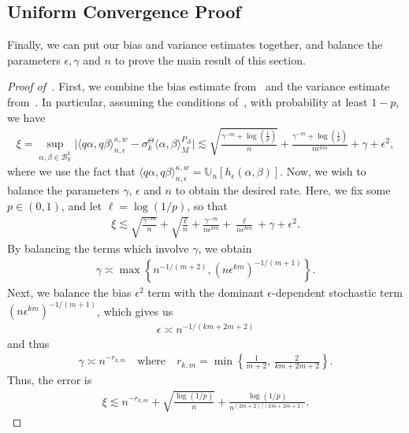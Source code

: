 \documentclass[11pt,reqno]{amsproc}
\numberwithin{equation}{section}
\newcommand{\R}{\mathbb{R}}
\newcommand{\U}{\mathbb{U}}
\newcommand{\cB}{\mathcal{B}}
\newcommand{\ls}{\lesssim}
\theoremstyle{definition}
\theoremstyle{plain}
\begin{document}
    \subsection{Uniform Convergence Proof} \label{ssec:uc_proof}

    Finally, we can put our bias and variance estimates together, and balance the parameters $\epsilon, \gamma$ and $n$ to prove the main result of this section.

    \begin{proof}[Proof of~]
        First, we combine the bias estimate from~ and the variance estimate from~. In particular, assuming the conditions of~, with probability at least $1-p$, we have
        \begin{align}
            \xi = \sup_{\alpha, \beta \in \cB_\R^k} \Big|\langle q\alpha, q\beta\rangle^{\kappa,w}_{n, \epsilon} - \sigma^\Theta_k \langle \alpha, \beta \rangle_M^{P_\Delta} \Big| \ls  \sqrt{ \frac{\gamma^{-m} + \log(\frac{1}{p})}{n}} + \frac{\gamma^{-m} + \log(\frac{1}{p})}{n\epsilon^{km}} + \gamma + \epsilon^2,
        \end{align}
        where we use the fact that $\langle q\alpha, q\beta\rangle^{\kappa,w}_{n, \epsilon} = \U_n[h_\epsilon(\alpha,\beta)]$. Now, we wish to balance the parameters $\gamma$, $\epsilon$ and $n$ to obtain the desired rate. Here, we fix some $p \in (0,1)$, and let $\ell = \log(1/p)$, so that
        \begin{align}
            \xi \ls  \sqrt{\frac{\gamma^{-m}}{n}} + \sqrt{\frac{\ell}{n}} + \frac{\gamma^{-m}}{n\epsilon^{km}} + \frac{\ell}{n\epsilon^{km}} + \gamma + \epsilon^2.
        \end{align}
        By balancing the terms which involve $\gamma$, we obtain
        \begin{align}
            \gamma \asymp \max \left\{ n^{-1/(m+2)}, (n\epsilon^{km})^{-1/(m+1)}\right\}.
        \end{align}
        Next, we balance the bias $\epsilon^2$ term with the dominant $\epsilon$-dependent stochastic term $(n\epsilon^{km})^{-1/(m+1)}$, which gives us
        \begin{align}
            \epsilon \asymp n^{-1/(km+2m+2)}
        \end{align}
        and thus 
        \begin{align}
            \gamma \asymp n^{-r_{k,m}} \quad \text{where} \quad r_{k,m} = \min \left\{ \frac{1}{m+2}, \, \frac{2}{km+2m+2}\right\}.
        \end{align}
        Thus, the error is
        \begin{align}
            \xi \ls n^{-r_{k,m}} + \sqrt{\frac{\log(1/p)}{n}} + \frac{\log(1/p)}{n^{(2m+2)/(km+2m+2)}}.
        \end{align}
    \end{proof}
\end{document}
